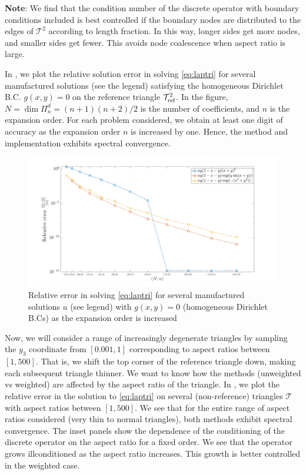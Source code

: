 \textbf{Note}: We find that the condition number of the discrete operator with boundary conditions included is best controlled if the boundary nodes are distributed to the edges of $\mathcal{T}^2$ according to length fraction. In this way, longer sides get more nodes, and smaller sides get fewer. This avoids node coalescence when aspect ratio is large.

In , we plot the relative solution error in solving \eqref{eq:laptri} for several manufactured solutions (see the legend) satisfying the homogeneous Dirichlet B.C. $g(x,y)=0$ on the reference triangle $\mathcal{T}_{\text{ref}}^2$. In the figure, $N = \dim\Pi_{n}^d = (n+1)(n+2)/2$ is the number of coefficients, and $n$ is the expansion order. For each problem considered, we obtain at least one digit of accuracy as the expansion order $n$ is increased by one. Hence, the method and implementation exhibits spectral convergence.
\begin{figure}[H]
	\centering
	\includegraphics[width=0.75\linewidth]{./figures/errs_lap_weight}
	\caption{Relative error in solving \eqref{eq:laptri} for several manufactured solutions $u$ (see legend) with $g(x,y) = 0$ (homogeneous Dirichlet B.Cs) as the expansion order is increased}\label{fig:errslapweight}
\end{figure}

Now, we will consider a range of increasingly degenerate triangles by sampling the $y_3$ coordinate from $[0.001,1]$ corresponding to aspect ratios between $[1,500]$. That is, we shift the top corner of the reference triangle down, making each subsequent triangle thinner. We want to know how the methods (unweighted vs weighted) are affected by the aspect ratio of the triangle. In , we plot the relative error in the solution to \eqref{eq:laptri} on several (non-reference) triangles $\mathcal{T}$ with aspect ratios between $[1,500]$. We see that for the entire range of aspect ratios considered (very thin to normal triangles), both methods exhibit spectral convergence. The inset panels show the dependence of the conditioning of the discrete operator on the aspect ratio for a fixed order. We see that the operator grows illconditioned as the aspect ratio increases. This growth is better controlled in the weighted case.

